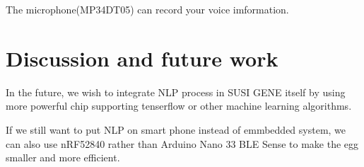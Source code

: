 \documentclass[manuscript,screen]{acmart}
\begin{document}
The microphone(MP34DT05) can record your voice imformation.



\section{Discussion and future work}

In the future, we wish to integrate NLP process in SUSI GENE itself by using more powerful chip supporting tenserflow or other machine learning algorithms. 

If we still want to put NLP on smart phone instead of emmbedded system, we can also use nRF52840 rather than Arduino Nano 33 BLE Sense to make the egg smaller and more efficient.




\end{document}
